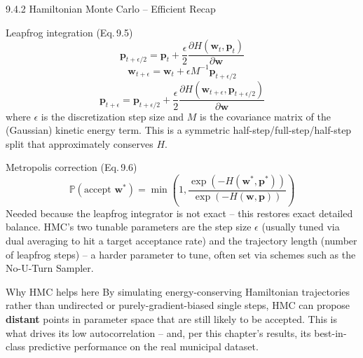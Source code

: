 \documentclass[aspectratio=169,10pt]{beamer}
\newcommand{\vw}{\mathbf{w}}
\newcommand{\vp}{\mathbf{p}}
\newcommand{\Prob}{\mathbb{P}}
\begin{document}
\begin{frame}[allowframebreaks]{9.4.2 Hamiltonian Monte Carlo -- Efficient Recap}

\begin{block}{Leapfrog integration (Eq.\,9.5)}
$$ \vp_{t+\epsilon/2} = \vp_t + \frac{\epsilon}{2}\frac{\partial H(\vw_t,\vp_t)}{\partial \vw} $$
$$ \vw_{t+\epsilon} = \vw_t + \epsilon M^{-1} \vp_{t+\epsilon/2} $$
$$ \vp_{t+\epsilon} = \vp_{t+\epsilon/2} + \frac{\epsilon}{2}\frac{\partial H(\vw_{t+\epsilon},\vp_{t+\epsilon/2})}{\partial \vw} $$
where $\epsilon$ is the discretization step size and $M$ is the covariance
matrix of the (Gaussian) kinetic energy term. This is a symmetric
half-step/full-step/half-step split that approximately conserves $H$.
\end{block}

\begin{block}{Metropolis correction (Eq.\,9.6)}
$$ \Prob(\text{accept } \vw^\ast) = \min\!\left(1, \frac{\exp(-H(\vw^\ast,\vp^\ast))}{\exp(-H(\vw,\vp))}\right) $$
Needed because the leapfrog integrator is not exact -- this restores exact
detailed balance. HMC's two tunable parameters are the step size $\epsilon$
(usually tuned via dual averaging to hit a target acceptance rate) and the
trajectory length (number of leapfrog steps) -- a harder parameter to tune,
often set via schemes such as the No-U-Turn Sampler.
\end{block}

\framebreak

\begin{block}{Why HMC helps here}
By simulating energy-conserving Hamiltonian trajectories rather than
undirected or purely-gradient-biased single steps, HMC can propose
\textbf{distant} points in parameter space that are still likely to be
accepted. This is what drives its low autocorrelation -- and, per this
chapter's results, its best-in-class predictive performance on the real
municipal dataset.
\end{block}

\end{frame}
\end{document}
